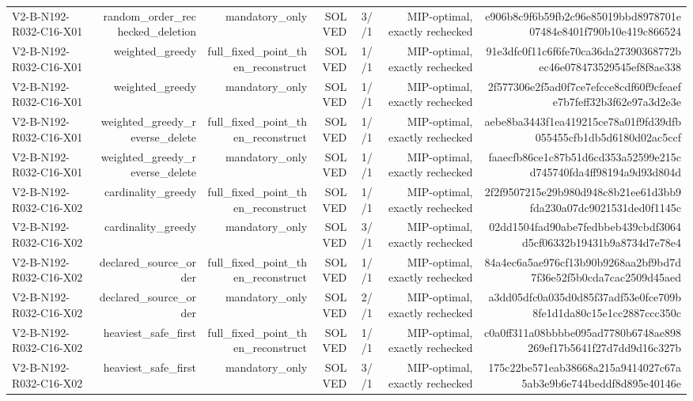 {\begin{longtable}{lrrrrrr}
V2-B-N192-R032-C16-X01 & random\_order\_rechecked\_deletion & mandatory\_only & SOLVED & 3//1 & MIP-optimal, exactly rechecked & e906b8c9f6b59fb2c96e85019bbd8978701e07484e8401f790b10e419c866524 \\
V2-B-N192-R032-C16-X01 & weighted\_greedy & full\_fixed\_point\_then\_reconstruct & SOLVED & 1//1 & MIP-optimal, exactly rechecked & 91e3dfc0f11c6f6fe70ca36da27390368772bec46e078473529545ef8f8ae338 \\
V2-B-N192-R032-C16-X01 & weighted\_greedy & mandatory\_only & SOLVED & 1//1 & MIP-optimal, exactly rechecked & 2f577306e2f5ad0f7ce7efcce8cdf60f9cfeaefe7b7feff32b3f62e97a3d2e3e \\
V2-B-N192-R032-C16-X01 & weighted\_greedy\_reverse\_delete & full\_fixed\_point\_then\_reconstruct & SOLVED & 1//1 & MIP-optimal, exactly rechecked & aebe8ba3443f1ea419215ce78a01f9fd39dfb055455cfb1db5d6180d02ac5ccf \\
V2-B-N192-R032-C16-X01 & weighted\_greedy\_reverse\_delete & mandatory\_only & SOLVED & 1//1 & MIP-optimal, exactly rechecked & faaecfb86ce1c87b51d6cd353a52599e215cd745740fda4ff98194a9d93d804d \\
V2-B-N192-R032-C16-X02 & cardinality\_greedy & full\_fixed\_point\_then\_reconstruct & SOLVED & 1//1 & MIP-optimal, exactly rechecked & 2f2f9507215e29b980d948c8b21ee61d3bb9fda230a07dc9021531ded0f1145c \\
V2-B-N192-R032-C16-X02 & cardinality\_greedy & mandatory\_only & SOLVED & 3//1 & MIP-optimal, exactly rechecked & 02dd1504fad90abe7fedbbeb439cbdf3064d5cf06332b19431b9a8734d7e78e4 \\
V2-B-N192-R032-C16-X02 & declared\_source\_order & full\_fixed\_point\_then\_reconstruct & SOLVED & 1//1 & MIP-optimal, exactly rechecked & 84a4ec6a5ae976cf13b90b9268aa2bf9bd7d7f36e52f5b0cda7cac2509d45aed \\
V2-B-N192-R032-C16-X02 & declared\_source\_order & mandatory\_only & SOLVED & 2//1 & MIP-optimal, exactly rechecked & a3dd05dfc0a035d0d85f37adf53e0fce709b8fe1d1da80c15e1cc2887ccc350c \\
V2-B-N192-R032-C16-X02 & heaviest\_safe\_first & full\_fixed\_point\_then\_reconstruct & SOLVED & 1//1 & MIP-optimal, exactly rechecked & c0a0ff311a08bbbbe095ad7780b6748ae898269ef17b5641f27d7dd9d16c327b \\
V2-B-N192-R032-C16-X02 & heaviest\_safe\_first & mandatory\_only & SOLVED & 3//1 & MIP-optimal, exactly rechecked & 175c22be571eab38668a215a9414027c67a5ab3e9b6e744beddf8d895e40146e \\

\end{longtable}}
